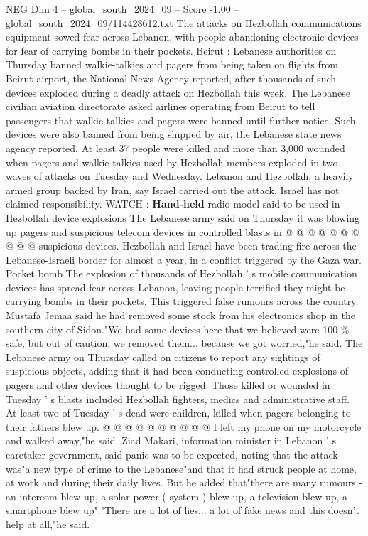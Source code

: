 \begin{textsample}{NEG Dim 4 – global\_south\_2024\_09 – Score -1.00 – global\_south\_2024\_09/114428612.txt}  \label{ex:f4_neg_186}
The attacks on Hezbollah communications equipment sowed fear across Lebanon, with people abandoning electronic devices for fear of carrying bombs in their pockets.
Beirut : Lebanese authorities on Thursday banned walkie-talkies and pagers from being taken on flights from Beirut airport, the National News Agency reported, after thousands of such devices exploded during a deadly attack on Hezbollah this week.
The Lebanese civilian aviation directorate asked airlines operating from Beirut to tell passengers that walkie-talkies and pagers were banned until further notice.
Such devices were also banned from being shipped by air, the Lebanese state news agency reported.
At least 37 people were killed and more than 3,000 wounded when pagers and walkie-talkies used by Hezbollah members exploded in two waves of attacks on Tuesday and Wednesday.
Lebanon and Hezbollah, a heavily armed group backed by Iran, say Israel carried out the attack.
Israel has not claimed responsibility.
WATCH : \textbf{Hand-held} radio model said to be used in Hezbollah device explosions The Lebanese army said on Thursday it was blowing up pagers and suspicious telecom devices in controlled blasts in @ @ @ @ @ @ @ @ @ @ suspicious devices.
Hezbollah and Israel have been trading fire across the Lebanese-Israeli border for almost a year, in a conflict triggered by the Gaza war.
Pocket bomb The explosion of thousands of Hezbollah ' s mobile communication devices has spread fear across Lebanon, leaving people terrified they might be carrying bombs in their pockets.
This triggered false rumours across the country.
Mustafa Jemaa said he had removed some stock from his electronics shop in the southern city of Sidon."We had some devices here that we believed were 100 \% safe, but out of caution, we removed them... because we got worried,"he said.
The Lebanese army on Thursday called on citizens to report any sightings of suspicious objects, adding that it had been conducting controlled explosions of pagers and other devices thought to be rigged.
Those killed or wounded in Tuesday ' s blasts included Hezbollah fighters, medics and administrative staff.
At least two of Tuesday ' s dead were children, killed when pagers belonging to their fathers blew up. @ @ @ @ @ @ @ @ @ @ I left my phone on my motorcycle and walked away,"he said.
Ziad Makari, information minister in Lebanon ' s caretaker government, said panic was to be expected, noting that the attack was"a new type of crime to the Lebanese"and that it had struck people at home, at work and during their daily lives.
But he added that"there are many rumours - an intercom blew up, a solar power ( system ) blew up, a television blew up, a smartphone blew up"."There are a lot of lies... a lot of fake news and this doesn't help at all,"he said.

\end{textsample}
